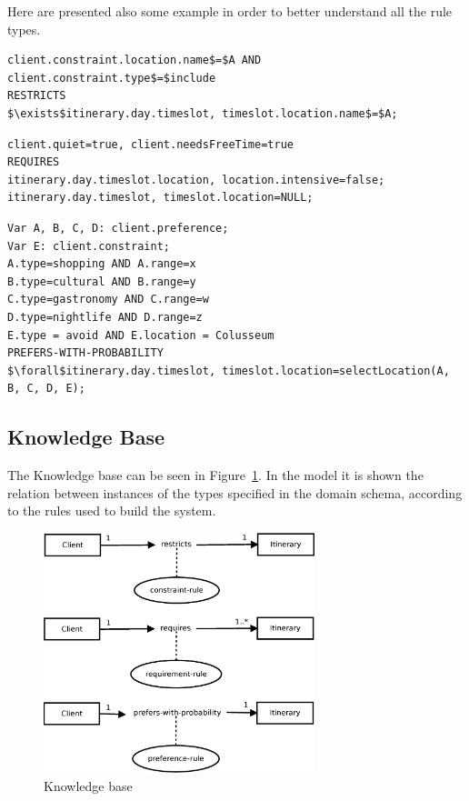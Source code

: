 \documentclass[11pt]{article} %
\begin{document}
\noindent
Here are presented also some example in order to better understand all the rule types.

\begin{lstlisting}[label=Rules,caption=The client wants to include a destination into the itinerary.,breaklines=true,mathescape=true]
client.constraint.location.name$=$A AND client.constraint.type$=$include
RESTRICTS
$\exists$itinerary.day.timeslot, timeslot.location.name$=$A;
\end{lstlisting}


\begin{lstlisting}[label=Rules,caption=The client is a quite person,breaklines=true,mathescape=true]
client.quiet=true, client.needsFreeTime=true
REQUIRES
itinerary.day.timeslot.location, location.intensive=false;
itinerary.day.timeslot, timeslot.location=NULL;
\end{lstlisting}




\begin{lstlisting}[label=Rules,caption=The client expresses four preferences with four ranges (from 1 to 5). The method selectLocation will compose the itinerary selecting the locations that fits the preferences. For example it could select 3 shopping\, 1 gastronomy and 1 cultural locations.,breaklines=true,mathescape=true]
Var A, B, C, D: client.preference;
Var E: client.constraint;
A.type=shopping AND A.range=x
B.type=cultural AND B.range=y
C.type=gastronomy AND C.range=w
D.type=nightlife AND D.range=z
E.type = avoid AND E.location = Colusseum
PREFERS-WITH-PROBABILITY
$\forall$itinerary.day.timeslot, timeslot.location=selectLocation(A, B, C, D, E);
\end{lstlisting}

\subsection{Knowledge Base}

The Knowledge base can be seen in Figure~\ref{fig:knowledgebase}.
In the model it is shown the relation between instances of the types specified in the domain schema, according to the rules used to build the system.

\begin{figure}[H]
\centering
\includegraphics[height=7cm]{images/knowledge_base.eps}
\caption{Knowledge base}
\label{fig:knowledgebase}
\end{figure}
\end{document}
